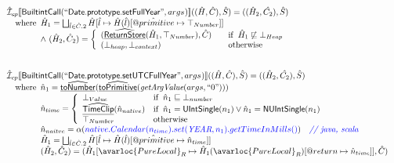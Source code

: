 \[
\begin{array}{l}

\aI _{cp}\lbr \SF{BuiltintCall}(``\SF{Date.prototype.setFullYear}",args_{})\rbr((\hat{H},\hat{C}), \hat{S})
  = ((\hat{H}_2, \hat{C_2}), \hat{S})\\
\quad\wherec{
  \hat{H}_1 = \bigsqcup_{\hat{l} \in \hat{C}.2} \hat{H}[\hat{l}
    \mapsto \hat{H}(\hat{l})[\avarprop{primitive} \mapsto \top_{Number}]]\\
  \land\ (\hat{H}_2, \hat{C}_2) = 
    \left\{\begin{array}{l@{\quad\quad}l}
      (\ahf{ReturnStore}(\hat{H}_1, \top_{Number}), \hat{C})
      & \ifc{\hat{H}_1 \not\sqsubseteq \bot_{Heap}}\\
      (\bot_{heap}, \bot_{context}) & \owc \\
    \end{array}\right.\\
  }\\
\\\\


\aI _{cp}\lbr \SF{BuiltintCall}(``\SF{Date.prototype.setUTCFullYear}",args_{})\rbr((\hat{H},\hat{C}), \hat{S})
  = ((\hat{H}_2, \hat{C_2}), \hat{S})\\
\quad\wherec{
  \hat{n}_{1} = \ahf{toNumber}(\ahf{toPrimitive}(\hf{getArgValue}(args, ``0")))\\
  \hat{n}_{time} = \left\{\begin{array}{ll}
      \bot_{Value} & \ifc{\hat{n}_{1} \sqsubseteq  \bot_{number}}\\
      \ahf{TimeClip}(\hat{n}_{native})
      & \ifc{\hat{n}_{1} = \SF{UIntSingle}(n_{1}) \lor \hat{n}_{1} = \SF{NUIntSingle}(n_{1}) }\\
      \top_{Number} & \owc
    \end{array}\right.\\
  \hat{n}_{naitve} = \alpha({\inblue native.Calendar(n_{time}).set(\emph{YEAR}, n_{1}).getTimeInMills()})
    \quad\comment{{\inblue // java, scala}}\\  
  \hat{H}_1 = \bigsqcup_{\hat{l} \in \hat{C}.2} \hat{H}[\hat{l}
    \mapsto \hat{H}(\hat{l})[\avarprop{primitive} \mapsto \hat{n}_{time}]]\\
  (\hat{H}_2, \hat{C}_2) = 
    (\hat{H}_1[\avarloc{PureLocal}_R \mapsto \hat{H}_1(\avarloc{PureLocal}_R)
      [\varprop{return} \mapsto \hat{n}_{time}]], \hat{C})\\
  }\\
\\\\


\end{array}\]
